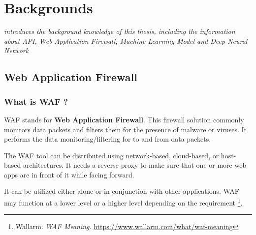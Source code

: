 \chapter{Backgrounds}
\label{chap:background}
	\textit{introduces the background knowledge of this thesis, including the information about API, Web Application Firewall, Machine Learning Model and Deep Neural Network}
\minitoc

\section{Web Application Firewall} 
\label{sec:waf}
	
\subsection{What is WAF ?}
\label{subsec:waf_def}
WAF stands for \textbf{Web Application Firewall}. This firewall solution commonly monitors data packets and filters them for the presence of malware or viruses. It performs the data monitoring/filtering for to and from data packets.  

The WAF tool can be distributed using network-based, cloud-based, or host-based architectures. It needs a reverse proxy to make sure that one or more web apps are in front of it while facing forward. 

It can be utilized either alone or in conjunction with other applications. WAF may function at a lower level or a higher level depending on the requirement \footnote{Wallarm. \textit{WAF Meaning}. \url{https://www.wallarm.com/what/waf-meaning}}.


